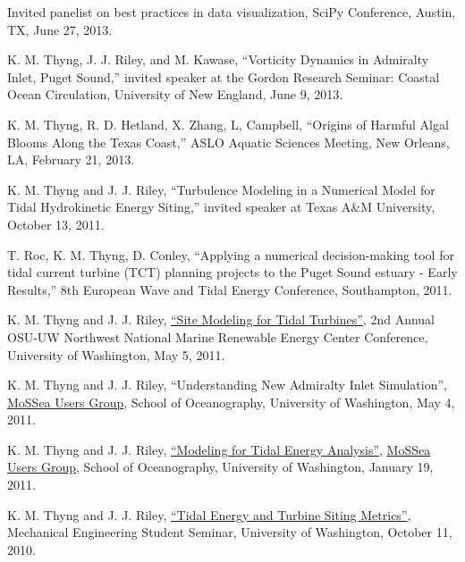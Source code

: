 \documentclass[10pt,letterpaper]{article}
\renewenvironment{itemize}{
  \begin{list}{}{
    \setlength{\leftmargin}{1.5em}
    \setlength{\itemsep}{0.25em}
    \setlength{\parskip}{0pt}
    \setlength{\parsep}{0.25em}
  }
}{
  \end{list}
}
\begin{document}
\begin{itemize}

\item Invited panelist on best practices in data visualization, SciPy Conference, Austin, TX, June 27, 2013.

\item K. M. Thyng, J. J. Riley, and M. Kawase, ``Vorticity Dynamics in Admiralty Inlet, Puget Sound,'' invited speaker at the Gordon Research Seminar: Coastal Ocean Circulation, University of New England, June 9, 2013.

\item K. M. Thyng, R. D. Hetland, X. Zhang, L, Campbell, ``Origins of Harmful Algal Blooms Along the Texas Coast,'' ASLO Aquatic Sciences Meeting, New Orleans, LA, February 21, 2013.

\item K. M. Thyng and J. J. Riley, ``Turbulence Modeling in a Numerical Model for Tidal Hydrokinetic Energy Siting,'' invited speaker at Texas A\&M University, October 13, 2011.

\item T. Roc, K. M. Thyng, D. Conley, ``Applying a numerical decision-making tool for tidal current turbine (TCT) planning projects to the Puget Sound estuary - Early Results,'' 8th European Wave and Tidal Energy Conference, Southampton, 2011.

\item K. M. Thyng and J. J. Riley, \href{http://froude.me.washington.edu/presentations/nnmrec050511.pdf}{``Site Modeling for Tidal Turbines''}, 2nd Annual OSU-UW Northwest National Marine Renewable Energy Center Conference, University of Washington, May 5, 2011.

\item K. M. Thyng and J. J. Riley, ``Understanding New Admiralty Inlet Simulation'', \href{http://faculty.washington.edu/pmacc/mug/mug_home.html}{MoSSea Users Group}, School of Oceanography, University of Washington, May 4, 2011.

\item K. M. Thyng and J. J. Riley, \href{http://faculty.washington.edu/pmacc/mug/meetings/Thyng_MUG_talk.pdf}{``Modeling for Tidal Energy Analysis''}, \href{http://faculty.washington.edu/pmacc/mug/mug_home.html}{MoSSea Users Group}, School of Oceanography, University of Washington, January 19, 2011.

\item K. M. Thyng and J. J. Riley, \href{http://froude.me.washington.edu/presentations/mess101110/mess101110.pdf}{``Tidal Energy and Turbine Siting Metrics''}, Mechanical Engineering Student Seminar, University of Washington, October 11, 2010.


\end{itemize}
\end{document}
